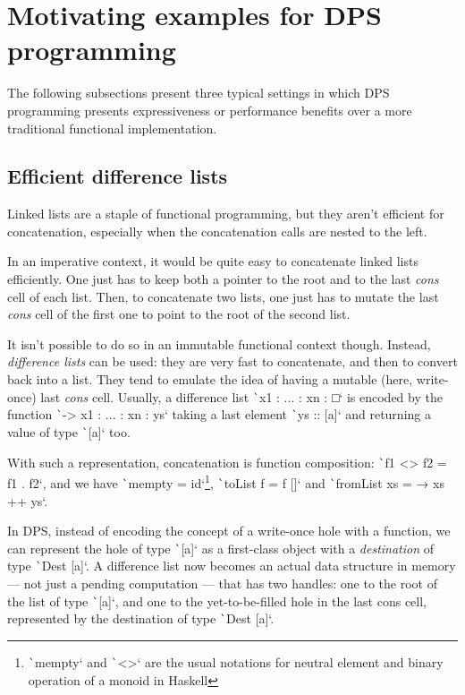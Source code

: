\documentclass[english]{jflart}
\begin{document}
\section{Motivating examples for DPS programming}\label{sec:motivating-examples}

The following subsections present three typical settings in which DPS programming presents expressiveness or performance benefits over a more traditional functional implementation.

\subsection{Efficient difference lists}\label{ssec:dlist}

Linked lists are a staple of functional programming, but they aren't efficient for concatenation, especially when the concatenation calls are nested to the left.

In an imperative context, it would be quite easy to concatenate linked lists efficiently. One just has to keep both a pointer to the root and to the last \emph{cons} cell of each list. Then, to concatenate two lists, one just has to mutate the last \emph{cons} cell of the first one to point to the root of the second list.

It isn't possible to do so in an immutable functional context though. Instead, \emph{difference lists} can be used: they are very fast to concatenate, and then to convert back into a list. They tend to emulate the idea of having a mutable (here, write-once) last \emph{cons} cell. Usually, a difference list \texttt`x1 : ... : xn : □` is encoded by the function \texttt`\ys -> x1 : ... : xn : ys` taking a last element \texttt`ys :: [a]` and returning a value of type \texttt`[a]` too.

With such a representation, concatenation is function composition: \texttt`f1 <> f2 = f1 . f2`, and we have \texttt`mempty = id`\footnote{\texttt`mempty` and \texttt`<>` are the usual notations for neutral element and binary operation of a monoid in Haskell}, \texttt`toList f = f []` and \texttt`fromList xs = \ys → xs ++ ys`.

In DPS, instead of encoding the concept of a write-once hole with a function, we can represent the hole of type \texttt`[a]` as a first-class object with a \emph{destination} of type \texttt`Dest [a]`. A difference list now becomes an actual data structure in memory --- not just a pending computation --- that has two handles: one to the root of the list of type \texttt`[a]`, and one to the yet-to-be-filled hole in the last cons cell, represented by the destination of type \texttt`Dest [a]`.
\end{document}
